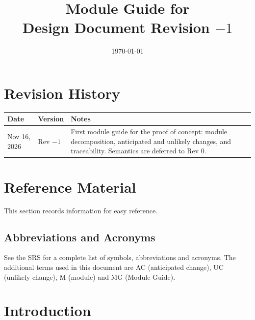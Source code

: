 \documentclass[12pt, titlepage]{article}
\begin{document}
\title{Module Guide for \progname{}\\ \large Design Document Revision $-1$}
\author{\authname}
\date{\today}

\maketitle


\section{Revision History}

\begin{tabularx}{\textwidth}{p{3cm} p{3cm} X}
\toprule
\textbf{Date} & \textbf{Version} & \textbf{Notes}\\
\midrule
Nov 16, 2026 & Rev $-1$ & First module guide for the proof of concept: module decomposition, anticipated and unlikely changes, and traceability. Semantics are deferred to Rev 0.\\
\bottomrule
\end{tabularx}

\newpage

\section{Reference Material}

This section records information for easy reference.

\subsection{Abbreviations and Acronyms}

See the SRS \citep{TandemSRS}
for a complete list of symbols, abbreviations and acronyms. The additional terms
used in this document are AC (anticipated change), UC (unlikely change), M
(module) and MG (Module Guide).

\newpage

\tableofcontents

\listoftables

\listoffigures

\newpage


\section{Introduction}
\end{document}
